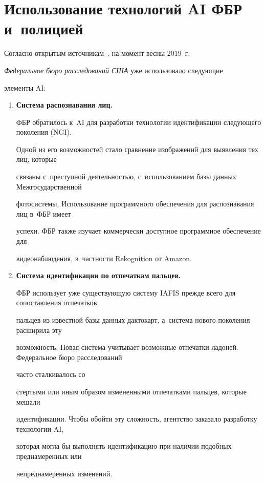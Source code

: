 \section{Использование технологий AI ФБР и~полицией} %





  Согласно открытым источникам~\cite{16-bor}, на момент весны 2019~г.\


\textit{Федеральное бюро расследований США} уже использовало следующие


элементы AI:


  \begin{enumerate}[1.]


\item %


\textbf{Система распознавания лиц.}


ФБР обратилось к~AI для разработки технологии идентификации следующего поколения (NGI).


Одной из его возможностей стало сравнение изображений для выявления тех лиц, которые


связаны с~пре\-ступ\-ной дея\-тель\-ностью, с~использованием базы данных Межгосударственной


фотосистемы. Использование программного обеспечения для распознавания лиц в~ФБР имеет


успехи. ФБР также изучает коммерчески доступное программное обеспечение для


видеонаблюдения, в~частности Rekognition от Amazon.


\item %


\textbf{Система идентификации по отпечаткам пальцев.}


ФБР использует уже существующую систему IAFIS прежде всего для сопоставления отпечатков


пальцев из известной базы данных дактокарт, а~сис\-те\-ма нового поколения расширила эту


возможность. Новая система учитывает возможные отпечатки ладоней. Федеральное бюро расследований


 часто сталкивалось со


стертыми или иным образом измененными отпечатками пальцев, которые мешали


идентификации. Чтобы обойти эту сложность, агентство заказало разработку технологии AI,


которая могла бы выполнять идентификацию при наличии подобных преднамеренных или


непреднамеренных изменений.


  \end{enumerate}





